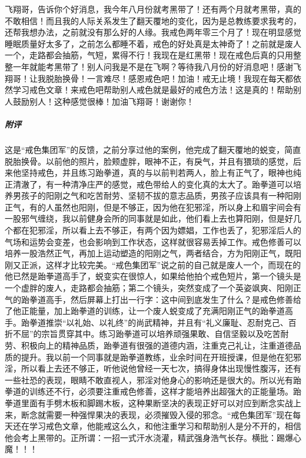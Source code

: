 \begin{case}
    飞翔哥，告诉你个好消息，我今年八月份就考黑带了！还有两个月就考黑带，真的不敢相信！而且我的人际关系发生了翻天覆地的变化，因为是总教练要求我考的，还帮我想办法，之前就没有那么好的人缘。我戒色两年零三个月了！现在明显感觉睡眠质量好太多了，之前怎么都睡不着，戒色的好处真是太神奇了！之前就是废人一个，走路都会抽筋，气短，累得不行！我现在是红黑带！现在戒色后真的只用整整一年就能考黑带了！别人问我是不是在飞啊？等待我八月份的好消息吧！感谢飞翔哥！让我脱胎换骨！一言难尽！感恩戒色吧！加油！戒无止境！我现在每天都依然学习戒色文章！来戒色吧帮助别人戒色就是最好的戒色方法！这是真的！帮助别人鼓励别人！这种感觉很棒！加油飞翔哥！谢谢你！
    \subparagraph{附评} 这是“戒色集团军”的反馈，之前分享过他的案例，他完成了翻天覆地的蜕变，简直脱胎换骨。以前他的照片，脸颊虚胖，眼神不正，有戾气，并且有猥琐的感觉，后来他坚持戒色，并且练习跆拳道，真的与以前判若两人，脸上有正气了，眼神也纯正清澈了，有一种清净庄严的感觉，戒色带给人的变化真的太大了。跆拳道可以培养男孩子的阳刚之气和吃苦耐劳、坚韧不拔的意志品质，男孩子应该具有一种阳刚正气，有的人虽然也阳刚，但是不够正，因为他在犯邪淫，所以身上和眉宇间会有一股邪气缠绕，我以前健身会所的同事就是如此，他们看上去也算阳刚，但是好几个都在犯邪淫，所以看上去不够正，有两个因为嫖娼，工作也丢了，犯邪淫后人的气场和运势会变差，也会影响到工作状态，这样就很容易丢掉工作。戒色修善可以培养一股浩然正气，再加上运动塑造的阳刚之气，两者结合，方为阳刚正气，既阳刚又正派，这样才比较完美。“戒色集团军”说之前的自己就是废人一个，而现在的他已然是跆拳道高手了，蜕变实在很惊人，如果给他拍个戒色短片，第一个镜头是一个虚胖的废人，走路都会抽筋；第二个镜头，突然变成了一个英姿飒爽、阳刚正气的跆拳道高手，然后屏幕上打出一行字：这中间到底发生了什么？是戒色修善给了他正能量，加上跆拳道的训练，让一个废人蜕变成了充满阳刚正气的跆拳道高手。跆拳道推崇“以礼始、以礼终”的尚武精神，并且有“礼义廉耻、忍耐克己、百折不屈”的宗旨贯穿其中。练习跆拳道可以培养顽强果敢、自信坚毅以及吃苦耐劳、积极向上的精神品质，跆拳道有很强的道德内涵，注重克己礼让，注重道德品质的提升。我以前一个同事就是跆拳道教练，业余时间在开班授课，但是他在犯邪淫，所以看上去还不够正，听他说他曾经一天七次，搞得身体出现慢性腹泻，还有一些社恐的表现，眼睛不敢直视人，邪淫对他身心的影响还是很大的。所以光有跆拳道的训练还不行，必须要注重戒色修善，这样才能培养出超强大的正能量场。跆拳道里面有手劈木板和脚踢木板，这种果断坚决的表现正好可以对应到断念实战上来，断念就需要一种强悍果决的表现，必须摧毁入侵的邪念。“戒色集团军”现在每天还在学习戒色文章，他能戒这么久，和他注重学习和帮助别人是分不开的，相信他会考上黑带的。正所谓：一招一式汗水浇灌，精武强身浩气长存。横批：踢爆心魔！！！
\end{case}

